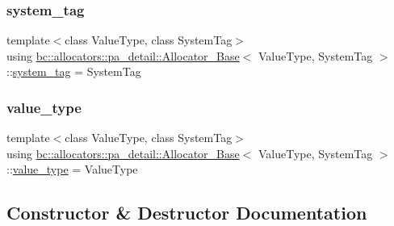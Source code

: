 \subsubsection{\texorpdfstring{system\+\_\+tag}{system\_tag}}
{\footnotesize\ttfamily template$<$class Value\+Type, class System\+Tag$>$ \\
using \hyperlink{structbc_1_1allocators_1_1pa__detail_1_1Allocator__Base}{bc\+::allocators\+::pa\+\_\+detail\+::\+Allocator\+\_\+\+Base}$<$ Value\+Type, System\+Tag $>$\+::\hyperlink{structbc_1_1allocators_1_1pa__detail_1_1Allocator__Base_ad85cad33901196bc10affe231300c020}{system\+\_\+tag} =  System\+Tag}

\mbox{\label{structbc_1_1allocators_1_1pa__detail_1_1Allocator__Base_afb5e955c647a4b6742010e2790398b1c}} 
\subsubsection{\texorpdfstring{value\+\_\+type}{value\_type}}
{\footnotesize\ttfamily template$<$class Value\+Type, class System\+Tag$>$ \\
using \hyperlink{structbc_1_1allocators_1_1pa__detail_1_1Allocator__Base}{bc\+::allocators\+::pa\+\_\+detail\+::\+Allocator\+\_\+\+Base}$<$ Value\+Type, System\+Tag $>$\+::\hyperlink{structbc_1_1allocators_1_1pa__detail_1_1Allocator__Base_afb5e955c647a4b6742010e2790398b1c}{value\+\_\+type} =  Value\+Type}



\subsection{Constructor \& Destructor Documentation}
\mbox{\label{structbc_1_1allocators_1_1pa__detail_1_1Allocator__Base_af497fc08777a9b271862b5947ebfbaf1}} 
